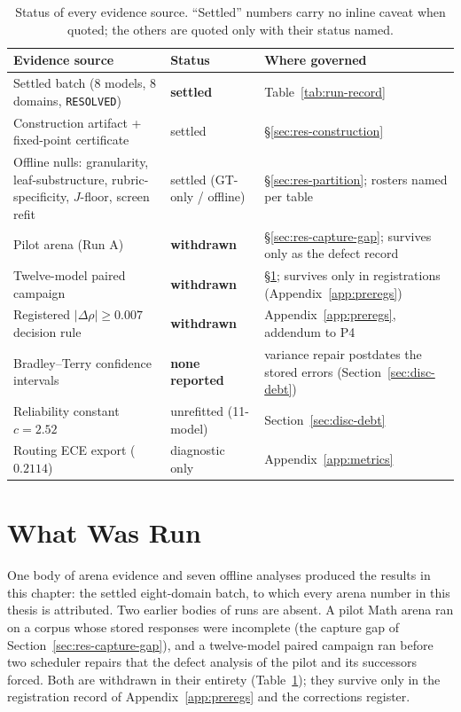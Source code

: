 \begin{table}[htbp]
\centering
\small
\caption{Status of every evidence source. ``Settled'' numbers carry no
inline caveat when quoted; the others are quoted only with their
status named.}
\label{tab:evidence-status}
\begin{tabular}{p{5.3cm}p{2.3cm}p{5.2cm}}
\toprule
Evidence source & Status & Where governed \\
\midrule
Settled batch (8 models, 8 domains, \texttt{RESOLVED}) &
\textbf{settled} & Table~\ref{tab:run-record} \\
Construction artifact + fixed-point certificate &
settled & \S\ref{sec:res-construction} \\
Offline nulls: granularity, leaf-substructure, rubric-specificity,
$J$-floor, screen refit & settled (GT-only / offline) &
\S\ref{sec:res-partition}; rosters named per table \\
Pilot arena (Run A) & \textbf{withdrawn} & \S\ref{sec:res-capture-gap};
survives only as the defect record \\
Twelve-model paired campaign & \textbf{withdrawn} &
\S\ref{sec:res-runs}; survives only in registrations
(Appendix~\ref{app:preregs}) \\
Registered $|\Delta\rho| \geq 0.007$ decision rule & \textbf{withdrawn}
& Appendix~\ref{app:preregs}, addendum to P4 \\
Bradley--Terry confidence intervals & \textbf{none reported} &
variance repair postdates the stored errors
(Section~\ref{sec:disc-debt}) \\
Reliability constant $c = 2.52$ & unrefitted (11-model) &
Section~\ref{sec:disc-debt} \\
Routing ECE export ($0.2114$) & diagnostic only &
Appendix~\ref{app:metrics} \\
\bottomrule
\end{tabular}
\end{table}

\section{What Was Run}\label{sec:res-runs}

One body of arena evidence and seven offline analyses produced the
results in this chapter: the settled eight-domain batch, to which every
arena number in this thesis is attributed. Two earlier bodies of runs
are absent. A pilot Math arena ran on a corpus whose stored responses
were incomplete (the capture gap of
Section~\ref{sec:res-capture-gap}), and a twelve-model paired campaign ran before two
scheduler repairs that the defect analysis of the pilot and its
successors forced. Both are withdrawn in their entirety
(Table~\ref{tab:evidence-status}); they survive only in the
registration record of Appendix~\ref{app:preregs} and the corrections
register.

